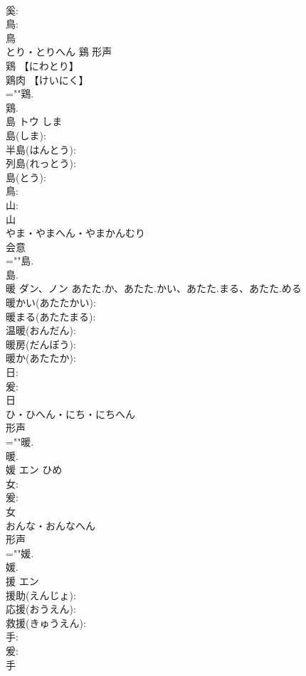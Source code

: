 \documentclass[8pt]{extreport}
\begin{document}
\begin{CJK}{UTF8}{min}
\\	奚: 
\\	鳥: 
\\	鳥	
\\	とり・とりへん	鷄	形声 
\\	鶏 【にわとり】 
\\	鶏肉 【けいにく】 
\\	=""鶏.
\\	鶏.
\\	島	トウ	しま		
\\	島(しま): 
\\	半島(はんとう): 
\\	列島(れっとう): 
\\	島(とう): 
\\	鳥: 
\\	山: 
\\	山	
\\	やま・やまへん・やまかんむり	
\\	会意 
\\	=""島.
\\	島.
\\	暖	ダン、ノン	あたた.か、あたた.かい、あたた.まる、あたた.める		
\\	暖かい(あたたかい): 
\\	暖まる(あたたまる): 
\\	温暖(おんだん): 
\\	暖房(だんぼう): 
\\	暖か(あたたか): 
\\	日: 
\\	爰: 
\\	日	
\\	ひ・ひへん・にち・にちへん	
\\	形声 
\\	=""暖.
\\	暖.
\\	媛	エン	ひめ		
\\	女: 
\\	爰: 
\\	女	
\\	おんな・おんなへん	
\\	形声 
\\	=""媛.
\\	媛.
\\	援	エン			
\\	援助(えんじょ): 
\\	応援(おうえん): 
\\	救援(きゅうえん): 
\\	手: 
\\	爰: 
\\	手	

\end{CJK}
\end{document}
